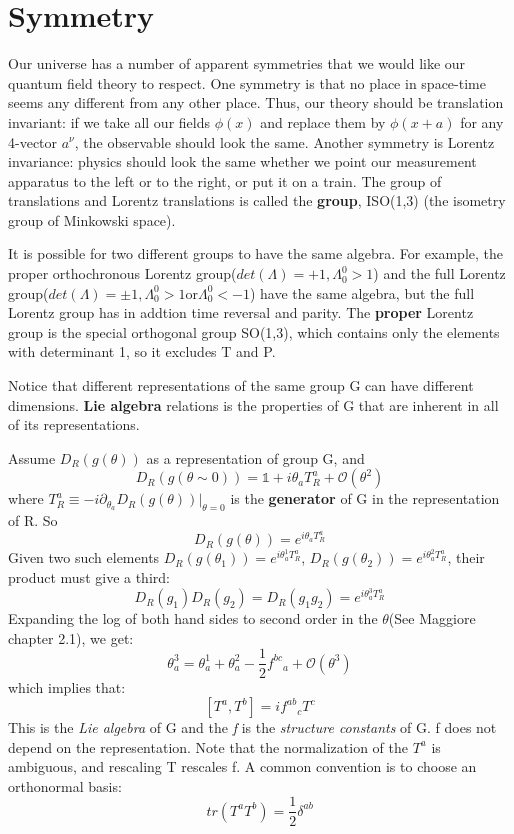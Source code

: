 \section{Symmetry}
Our universe has a number of apparent symmetries that we would like our
quantum field theory to respect. One symmetry is that no place in space-time
seems any different from any other place. Thus, our theory should be
translation invariant: if we take all our fields $\phi(x)$ and replace them
by $\phi(x+a)$ for any 4-vector $a^\nu$, the observable should look the
same. Another symmetry is Lorentz invariance: physics should look the same
whether we point our measurement apparatus to the left or to the right, or
put it on a train. The group of translations and Lorentz translations is
called the \textbf{\Poincare{} group}, ISO(1,3) (the isometry group of
Minkowski space).

It is possible for two different groups to have the same algebra. For
example, the proper orthochronous Lorentz group($det(\Lambda)=+1,
\Lambda^0_0>1$) and the full Lorentz group($det(\Lambda)=\pm1,
\Lambda^0_0>1 \text{or} \Lambda^0_0<-1$)
have the same algebra, but the full Lorentz group has in addtion time
reversal and parity. The \textbf{proper} Lorentz group is the special
orthogonal group SO(1,3), which contains only the elements with determinant
1, so it excludes T and P.

Notice that different representations of the same group G can have different
dimensions. \textbf{Lie algebra} relations is the properties of G that are
inherent in all of its representations.
 
 Assume $D_R(g(\theta))$ as a representation of group G, and 
 \[
     D_R(g(\theta\sim0)) = \mathds{1} + i\theta_aT^a_R + \mathcal{O}(\theta^2)
     \]
 where $T^a_R \equiv -i\partial_{\theta_a}D_R(g(\theta))|_{\theta=0}$ 
 is the \textbf{generator} of G in the representation of R. So
 \[
     D_R(g(\theta)) = e^{i\theta_aT^a_R}
     \]
 Given two such elements $D_R(g(\theta_1)) = e^{i\theta^1_aT^a_R}$, 
 $D_R(g(\theta_2)) = e^{i\theta^2_aT^a_R}$, their product must give a third:
 \[
     D_R(g_1)D_R(g_2) = D_R(g_1g_2) = e^{i\theta^3_aT^a_R}
     \]
 Expanding the log of both hand sides to second order in the $\theta$(See
 Maggiore chapter 2.1), we get:
 \[
     \theta^3_a = \theta^1_a + \theta^2_a - \frac{1}{2}f^{bc}{}_a +\mathcal{O}(\theta^3)
     \]
 which implies that:
 \[
     [T^a, T^b] = if^{ab}{}_cT^c
     \]
 This is the \emph{Lie algebra} of G and the \emph{f} is the \emph{structure
 constants} of G. f does not depend on the representation. Note that the
 normalization of the $T^a$ is ambiguous, and rescaling T rescales f. A
 common convention is to choose an orthonormal basis:
 \[
     tr(T^aT^b) = \frac{1}{2}\delta^{ab}
     \]

